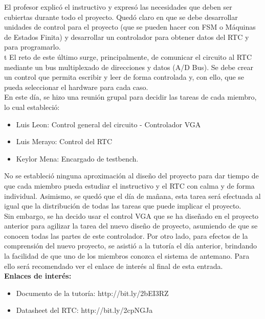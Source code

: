 \documentclass[12pt,a4paper]{report}
\begin{document}
El profesor explicó el instructivo y expresó las necesidades que deben ser cubiertas durante todo el proyecto. Quedó claro en que se debe desarrollar unidades de control para el proyecto (que se pueden hacer con FSM o Máquinas de Estados Finita) y desarrollar un controlador para obtener datos del RTC y para programarlo. \\

t El reto de este último surge, principalmente, de comunicar el circuito al RTC mediante un bus multiplexado de direcciones y datos (A/D Bus). Se debe crear un control que permita escribir y leer de forma controlada y, con ello, que se pueda seleccionar el hardware para cada caso. \\

\indent En este día, se hizo una reunión grupal para decidir las tareas de cada miembro, lo cual estableció: 

\begin{itemize}
	\item Luis Leon: Control general del circuito - Controlador VGA
	\item Luis Merayo: Control del RTC
	\item Keylor Mena: Encargado de testbench.
\end{itemize}

No se estableció ninguna aproximación al diseño del proyecto para dar tiempo de que cada miembro pueda estudiar el instructivo y el RTC con calma y de forma individual. Asimismo, se quedó que el día de mañana, esta tarea será efectuada al igual que la distribución de todas las tareas que puede implicar el proyecto. \\

Sin embargo, se ha decido usar el control VGA que se ha diseñado en el proyecto anterior para agilizar la tarea del nuevo diseño de proyecto, asumiendo de que se conocen todas las partes de este controlador. Por otro lado, para efectos de la comprensión del nuevo proyecto, se asistió a la tutoría el día anterior, brindando la facilidad de que uno de los miembros conozca el sistema de antemano. Para ello será recomendado ver el enlace de interés al final de esta entrada. \\

\noindent \textbf{Enlaces de interés:}
\begin{itemize}
	
	\item Documento de la tutoría: http://bit.ly/2bEI3RZ
	\item Datasheet del RTC: http://bit.ly/2cpNGJa
\end{itemize}
\end{document}
